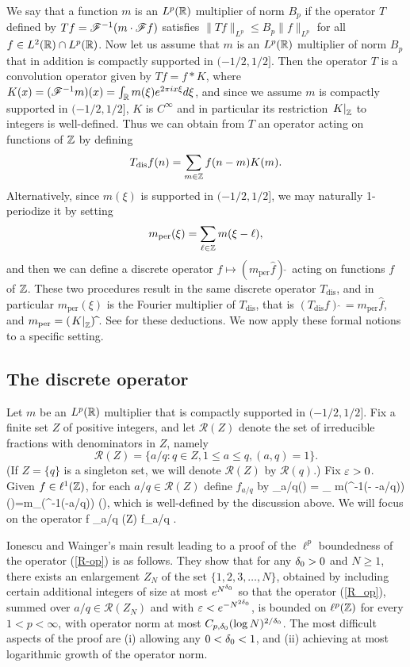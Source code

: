 \documentclass[oneside,11pt]{amsart}
\newcommand{\Rcal}{\mathcal{R}}
\begin{document}
 
We   say that a function $m$ is an $L^p(\mathbb{R})$ multiplier of norm $B_p$ if   the operator $T$ defined by $Tf = \mathscr{F}^{-1}(m  \cdot \mathscr{F} f)$ satisfies $\|Tf\|_{L^p} \leq B_p \|f\|_{L^p}$ for  all $f \in L^2(\mathbb{R}) \cap L^p(\mathbb{R})$.
Now let us assume that $m$ is an $L^p(\mathbb{R})$ multiplier of norm $B_p$ that in addition is compactly supported in $(-1/2,1/2]$.
Then the operator $T$ is a convolution operator given by $Tf = f*K$, where $K (x)= (\mathscr{F}^{-1}m)(x) = \int_{\mathbb{R}} m(\xi)e^{2\pi i x \xi} d\xi$, and since we assume $m$ is compactly supported in $(-1/2,1/2]$, $K$ is $C^\infty$ and in particular its restriction $\left. K \right|_{\mathbb{Z}}$ to integers is well-defined. Thus we can obtain from $T$ an operator acting on functions of $\mathbb{Z}$ by defining
\[ T_{\mathrm{dis}}f(n)= \sum_{m \in \mathbb{Z}} f(n-m) K(m).\]
Alternatively, since $m(\xi)$ is supported in $(-1/2,1/2]$, we may naturally 1-periodize it by setting
\[ m_{\mathrm{per}}(\xi) = \sum_{\ell \in \mathbb{Z}} m(\xi  -\ell),\]
and then we can define a discrete operator $f \mapsto (m_{\mathrm{per}} \widehat{f})\check{\;}$ acting on functions $f$ of $\mathbb{Z}$. 
These two procedures result in the same discrete operator $T_{\mathrm{dis}}$, and in particular $m_{\mathrm{per}}(\xi)$ is the Fourier multiplier of $T_{\mathrm{dis}}$, that is $(T_{\mathrm{dis}}f)\widehat{\;} = m_{\mathrm{per}} \widehat{f}$, and $m_{\mathrm{per}}  = (\left. K \right|_{\mathbb{Z}}) \widehat{\;}$. See  \cite[\S 2]{MSW} for these deductions.
 We  now apply these formal notions to a specific setting.
 
 \subsection{The discrete operator}

 Let $m$ be an $L^p(\mathbb{R})$ multiplier that is compactly supported in $(-1/2,1/2]$.
Fix a finite set $Z$ of positive integers, and let $\Rcal(Z)$ denote the set of irreducible fractions with denominators in $Z$, namely
\[ \Rcal(Z) = \{ a/q : q \in Z, 1 \leq a \leq q,  (a,q)=1\}.\]
(If $Z=\{q\}$ is a singleton set, we will denote $\Rcal(Z)$ by $\Rcal(q)$.)
Fix  $\varepsilon>0$.
Given $f \in \ell^1(\mathbb{Z})  $, for each $a/q \in \Rcal(Z)$ define $f_{a/q}$ by 
\beq\label{f_dfn}
 _{a/q}(\xi)  =  \sum_{\ell \in \Z} m(\ep^{-1}(\xi - \ell -a/q)) (\xi)=m_{}(\ep^{-1}(\xi   -a/q)) (\xi),
 \eeq
 which is well-defined by the discussion above.
We will focus on the operator
\beq\label{R_op}
 f \mapsto \sum_{a/q \in \Rcal(Z)} f_{a/q} .
 \eeq
 
Ionescu and Wainger's main result \cite[Thm. 1.5]{IW}  leading to a proof of the $\ell^p$ boundedness of the operator (\ref{R-op}) is as follows. They show that for any $\delta_0>0$ and $N \geq 1$,  there exists an enlargement $Z_N$ of the set $\{1,2,3,\ldots, N\}$, obtained  by including certain additional integers of size at most $e^{N^{\delta_0}}$ so that the operator 
(\ref{R_op}), summed over  $a/q \in \Rcal(Z_N)$ and with $\varepsilon< e^{-N^{2\delta_0}}$, is bounded on $\ell^p(\mathbb{Z})$ for every $1<p<\infty$, with operator norm at most  $ C_{p,\delta_0} (\log N)^{2/\delta_0}$. The most difficult aspects of the proof are (i) allowing any $0<\delta_0<1$, and (ii) achieving at most logarithmic growth of the operator norm.
\end{document}
